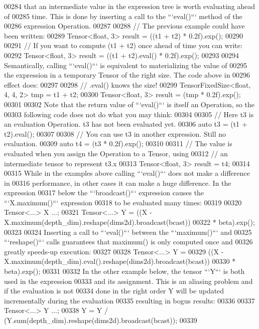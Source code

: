 \begin{DoxyCode}
00284 that an intermediate value in the expression tree is worth evaluating ahead of
00285 time.  This is done by inserting a call to the ```eval()``` method of the
00286 expression Operation.
00287 
00288     // The previous example could have been written:
00289     Tensor<float, 3> result = ((t1 + t2) * 0.2f).exp();
00290 
00291     // If you want to compute (t1 + t2) once ahead of time you can write:
00292     Tensor<float, 3> result = ((t1 + t2).eval() * 0.2f).exp();
00293 
00294 Semantically, calling ```eval()``` is equivalent to materializing the value of
00295 the expression in a temporary Tensor of the right size.  The code above in
00296 effect does:
00297 
00298     // .eval() knows the size!
00299     TensorFixedSize<float, 4, 4, 2> tmp = t1 + t2;
00300     Tensor<float, 3> result = (tmp * 0.2f).exp();
00301 
00302 Note that the return value of ```eval()``` is itself an Operation, so the
00303 following code does not do what you may think:
00304 
00305     // Here t3 is an evaluation Operation.  t3 has not been evaluated yet.
00306     auto t3 = (t1 + t2).eval();
00307 
00308     // You can use t3 in another expression.  Still no evaluation.
00309     auto t4 = (t3 * 0.2f).exp();
00310 
00311     // The value is evaluated when you assign the Operation to a Tensor, using
00312     // an intermediate tensor to represent t3.x
00313     Tensor<float, 3> result = t4;
00314 
00315 While in the examples above calling ```eval()``` does not make a difference in
00316 performance, in other cases it can make a huge difference.  In the expression
00317 below the ```broadcast()``` expression causes the ```X.maximum()``` expression
00318 to be evaluated many times:
00319 
00320     Tensor<...> X ...;
00321     Tensor<...> Y = ((X - X.maximum(depth\_dim).reshape(dims2d).broadcast(bcast))
00322                      * beta).exp();
00323 
00324 Inserting a call to ```eval()``` between the ```maximum()``` and
00325 ```reshape()``` calls guarantees that maximum() is only computed once and
00326 greatly speeds-up execution:
00327 
00328     Tensor<...> Y =
00329       ((X - X.maximum(depth\_dim).eval().reshape(dims2d).broadcast(bcast))
00330         * beta).exp();
00331 
00332 In the other example below, the tensor ```Y``` is both used in the expression
00333 and its assignment.  This is an aliasing problem and if the evaluation is not
00334 done in the right order Y will be updated incrementally during the evaluation
00335 resulting in bogus results:
00336 
00337      Tensor<...> Y ...;
00338      Y = Y / (Y.sum(depth\_dim).reshape(dims2d).broadcast(bcast));
00339 

\end{DoxyCode}
